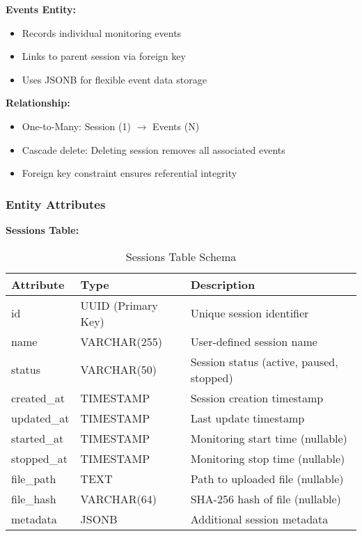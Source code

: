 \textbf{Events Entity:}
\begin{itemize}
    \item Records individual monitoring events
    \item Links to parent session via foreign key
    \item Uses JSONB for flexible event data storage
\end{itemize}

\textbf{Relationship:}
\begin{itemize}
    \item One-to-Many: Session (1) $\rightarrow$ Events (N)
    \item Cascade delete: Deleting session removes all associated events
    \item Foreign key constraint ensures referential integrity
\end{itemize}

\subsubsection{Entity Attributes}

\textbf{Sessions Table:}
\begin{table}[h]
\centering
\small
\begin{tabular}{|l|l|l|}
\hline
\textbf{Attribute} & \textbf{Type} & \textbf{Description} \\
\hline
id & UUID (Primary Key) & Unique session identifier \\
name & VARCHAR(255) & User-defined session name \\
status & VARCHAR(50) & Session status (active, paused, stopped) \\
created\_at & TIMESTAMP & Session creation timestamp \\
updated\_at & TIMESTAMP & Last update timestamp \\
started\_at & TIMESTAMP & Monitoring start time (nullable) \\
stopped\_at & TIMESTAMP & Monitoring stop time (nullable) \\
file\_path & TEXT & Path to uploaded file (nullable) \\
file\_hash & VARCHAR(64) & SHA-256 hash of file (nullable) \\
metadata & JSONB & Additional session metadata \\
\hline
\end{tabular}
\caption{Sessions Table Schema}
\end{table}

